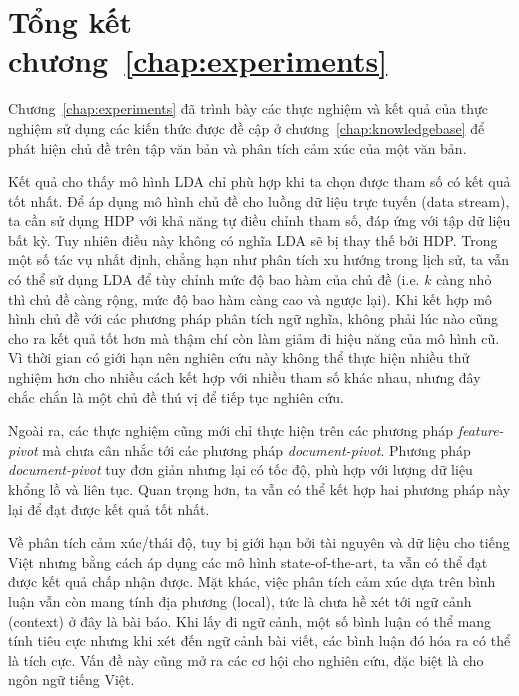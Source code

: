 \section{Tổng kết chương~\ref{chap:experiments}}
Chương~\ref{chap:experiments} đã trình bày các thực nghiệm và kết quả của thực nghiệm sử dụng các kiến thức được đề cập ở chương~\ref{chap:knowledgebase} để phát hiện chủ đề trên tập văn bản và phân tích cảm xúc của một văn bản.

Kết quả cho thấy mô hình \acrshort{LDA} chỉ phù hợp khi ta chọn được tham số có kết quả tốt nhất. Để áp dụng mô hình chủ đề cho luồng dữ liệu trực tuyến (data stream), ta cần sử dụng \acrshort{HDP} với khả năng tự điều chỉnh tham số, đáp ứng với tập dữ liệu bất kỳ. Tuy nhiên điều này không có nghĩa \acrshort{LDA} sẽ bị thay thế bởi \acrshort{HDP}. Trong một số tác vụ nhất định, chẳng hạn như phân tích xu hướng trong lịch sử, ta vẫn có thể sử dụng \acrshort{LDA} để tùy chỉnh mức độ bao hàm của chủ đề (i.e. $k$ càng nhỏ thì chủ đề càng rộng, mức độ bao hàm càng cao và ngược lại). Khi kết hợp mô hình chủ đề với các phương pháp phân tích ngữ nghĩa, không phải lúc nào cũng cho ra kết quả tốt hơn mà thậm chí còn làm giảm đi hiệu năng của mô hình cũ. Vì thời gian có giới hạn nên nghiên cứu này không thể thực hiện nhiều thử nghiệm hơn cho nhiều cách kết hợp với nhiều tham số khác nhau, nhưng đây chắc chắn là một chủ đề thú vị để tiếp tục nghiên cứu.

Ngoài ra, các thực nghiệm cũng mới chỉ thực hiện trên các phương pháp \textit{feature-pivot} mà chưa cân nhắc tới các phương pháp \textit{document-pivot}. Phương pháp \textit{document-pivot} tuy đơn giản nhưng lại có tốc độ, phù hợp với lượng dữ liệu khổng lồ và liên tục. Quan trọng hơn, ta vẫn có thể kết hợp hai phương pháp này lại để đạt được kết quả tốt nhất.

Về phân tích cảm xúc/thái độ, tuy bị giới hạn bởi tài nguyên và dữ liệu cho tiếng Việt nhưng bằng cách áp dụng các mô hình state-of-the-art, ta vẫn có thể đạt được kết quả chấp nhận được. Mặt khác, việc phân tích cảm xúc dựa trên bình luận vẫn còn mang tính địa phương (local), tức là chưa hề xét tới ngữ cảnh (context) ở đây là bài báo. Khi lấy đi ngữ cảnh, một số bình luận có thể mang tính tiêu cực nhưng khi xét đến ngữ cảnh bài viết, các bình luận đó hóa ra có thể là tích cực. Vấn đề này cũng mở ra các cơ hội cho nghiên cứu, đặc biệt là cho ngôn ngữ tiếng Việt.